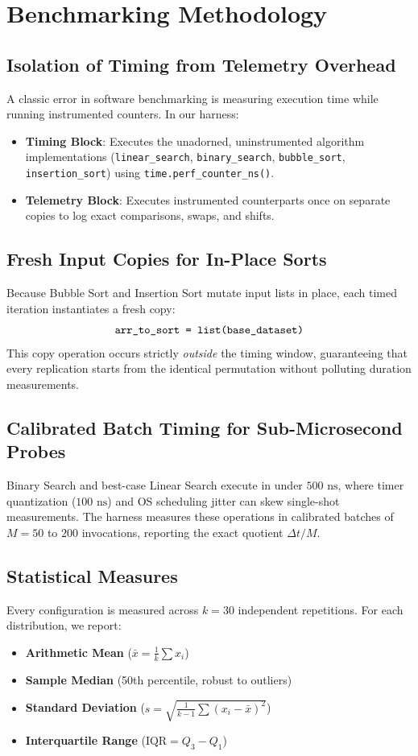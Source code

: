 \section{Benchmarking Methodology}

\subsection{Isolation of Timing from Telemetry Overhead}
A classic error in software benchmarking is measuring execution time while running instrumented counters. In our harness:
\begin{itemize}
    \item \textbf{Timing Block}: Executes the unadorned, uninstrumented algorithm implementations (\texttt{linear\_search}, \texttt{binary\_search}, \texttt{bubble\_sort}, \texttt{insertion\_sort}) using \texttt{time.perf\_counter\_ns()}.
    \item \textbf{Telemetry Block}: Executes instrumented counterparts once on separate copies to log exact comparisons, swaps, and shifts.
\end{itemize}

\subsection{Fresh Input Copies for In-Place Sorts}
Because Bubble Sort and Insertion Sort mutate input lists in place, each timed iteration instantiates a fresh copy:
$$\text{\texttt{arr\_to\_sort = list(base\_dataset)}}$$
This copy operation occurs strictly \emph{outside} the timing window, guaranteeing that every replication starts from the identical permutation without polluting duration measurements.

\subsection{Calibrated Batch Timing for Sub-Microsecond Probes}
Binary Search and best-case Linear Search execute in under $500\text{ ns}$, where timer quantization ($100\text{ ns}$) and OS scheduling jitter can skew single-shot measurements. The harness measures these operations in calibrated batches of $M = 50$ to $200$ invocations, reporting the exact quotient $\Delta t / M$.

\subsection{Statistical Measures}
Every configuration is measured across $k = 30$ independent repetitions. For each distribution, we report:
\begin{itemize}
    \item \textbf{Arithmetic Mean} ($\bar{x} = \frac{1}{k} \sum x_i$)
    \item \textbf{Sample Median} (50th percentile, robust to outliers)
    \item \textbf{Standard Deviation} ($s = \sqrt{\frac{1}{k-1} \sum (x_i - \bar{x})^2}$)
    \item \textbf{Interquartile Range} ($\text{IQR} = Q_3 - Q_1$)
\end{itemize}

